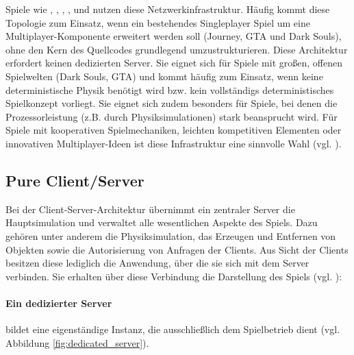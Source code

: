Spiele wie , , , ,  und  nutzen diese Netzwerkinfrastruktur. Häufig kommt diese Topologie zum Einsatz, wenn ein bestehendes Singleplayer Spiel um eine Multiplayer-Komponente erweitert werden soll (Journey, GTA und Dark Souls), ohne den Kern des Quellcodes grundlegend umzustrukturieren. Diese Architektur erfordert keinen dedizierten Server. Sie eignet sich für Spiele mit großen, offenen Spielwelten (Dark Souls, GTA) und kommt häufig zum Einsatz, wenn keine deterministische Physik benötigt wird bzw. kein vollständigs deterministisches Spielkonzept vorliegt. Sie eignet sich zudem besonders für Spiele, bei denen die Prozessorleistung (z.B. durch Physiksimulationen) stark beansprucht wird. Für Spiele mit kooperativen Spielmechaniken, leichten kompetitiven Elementen oder innovativen Multiplayer-Ideen ist diese Infrastruktur eine sinnvolle Wahl (vgl. \citealp{noauthor_choosing_2024}).

\subsection{Pure Client/Server}
Bei der Client-Server-Architektur übernimmt ein zentraler Server die Hauptsimulation und verwaltet alle wesentlichen Aspekte des Spiels. Dazu gehören unter anderem die Physiksimulation, das Erzeugen und Entfernen von Objekten sowie die Autorisierung von Anfragen der Clients. Aus Sicht der Clients besitzen diese lediglich die Anwendung, über die sie sich mit dem Server verbinden. Sie erhalten über diese Verbindung die Darstellung des Spiels (vgl. \citealp{noauthor_client-server_2024}):
\paragraph{Ein dedizierter Server} bildet eine eigenständige Instanz, die ausschließlich dem Spielbetrieb dient (vgl. Abbildung \ref{fig:dedicated_server}).

